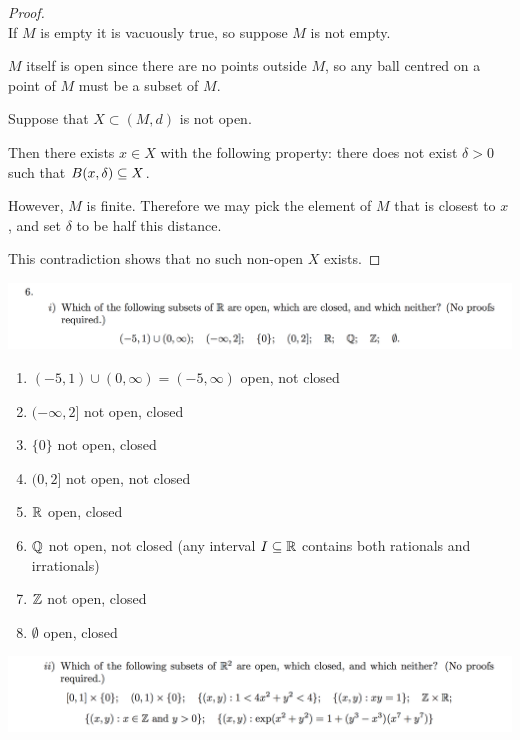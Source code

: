 \documentclass[12pt]{article}
\begin{document}
\begin{proof}~\\
  If $M$ is empty it is vacuously true, so suppose $M$ is not empty.

  $M$ itself is open since there are no points outside $M$, so any ball centred on a point of $M$
  must be a subset of $M$.

  Suppose that $X \subset (M, d)$ is not open.

  Then there exists $x \in X$ with the following property: there does not exist $\delta > 0$ such
  that $B(x, \delta) \subseteq X$.

  However, $M$ is finite. Therefore we may pick the element of $M$ that is closest to $x$, and set
  $\delta$ to be half this distance.

  This contradiction shows that no such non-open $X$ exists.
\end{proof}

\begin{mdframed}
\includegraphics[width=400pt]{img/oxford-a2-1-6-1.png}
\end{mdframed}

\begin{enumerate}
\item $(-5, 1) \cup (0, \infty) = (-5, \infty)$ open, not closed
\item $(-\infty, 2]$ not open, closed
\item $\{0\}$ not open, closed
\item $(0, 2]$ not open, not closed
\item $\mathbb{R}$ open, closed
\item $\mathbb{Q}$ not open, not closed (any interval $I \subseteq \mathbb{R}$ contains both rationals and irrationals)
\item $\mathbb{Z}$ not open, closed
\item $\emptyset$ open, closed
\end{enumerate}

\begin{mdframed}
\includegraphics[width=400pt]{img/oxford-a2-1-6-2.png}
\end{mdframed}
\end{document}
